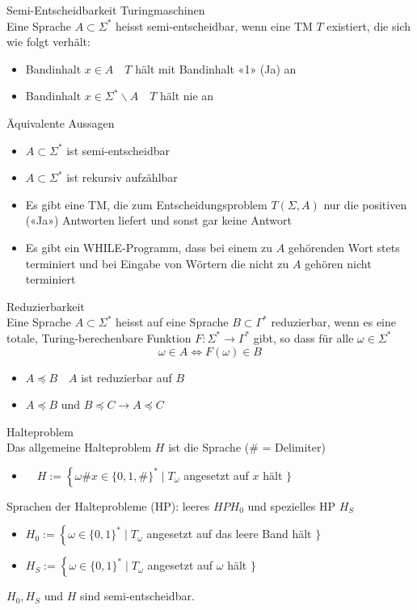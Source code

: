 \begin{corollary}{Semi-Entscheidbarkeit Turingmaschinen}\\
    Eine Sprache $A \subset \Sigma^{*}$ heisst semi-entscheidbar, wenn eine TM $T$ existiert, die sich wie folgt verhält:

    \begin{itemize}
    \item Bandinhalt $x \in A \quad T$ hält mit Bandinhalt «1» (Ja) an
    \item Bandinhalt $x \in \Sigma^{*} \backslash A \quad T$ hält nie an
    \end{itemize}

    Äquivalente Aussagen
    \begin{itemize}
    \item $A \subset \Sigma^{*}$ ist semi-entscheidbar
    \item $A \subset \Sigma^{*}$ ist rekursiv aufzählbar
    \item Es gibt eine TM, die zum Entscheidungsproblem $T(\Sigma, A)$ nur die positiven («Ja») Antworten liefert und sonst gar keine Antwort
    \item Es gibt ein WHILE-Programm, dass bei einem zu $A$ gehörenden Wort stets terminiert und bei Eingabe von Wörtern die nicht zu $A$ gehören nicht terminiert
    \end{itemize}
\end{corollary}

\begin{theorem}{Reduzierbarkeit}\\
    Eine Sprache $A \subset \Sigma^{*}$ heisst auf eine Sprache $B \subset \Gamma^{*}$ reduzierbar, wenn es eine totale, Turing-berechenbare Funktion $F: \Sigma^{*} \rightarrow \Gamma^{*}$ gibt, so dass für alle $\omega \in \Sigma^{*}$
    $$
    \omega \in A \Leftrightarrow F(\omega) \in B
    $$
    \begin{itemize}
    \item $A \preccurlyeq B \quad A$ ist reduzierbar auf $B$
    \item $A \preccurlyeq B$ und $B \preccurlyeq C \rightarrow A \preccurlyeq C$
    \end{itemize}
\end{theorem}

\begin{concept}{Halteproblem}\\
    Das allgemeine Halteproblem $H$ ist die Sprache (\# = Delimiter)
    \begin{itemize}
    \item $\quad H:=\left\{\omega \# x \in\{0,1, \#\}^{*} \mid T_{\omega}\right.$ angesetzt auf $x$ hält $\}$
    \end{itemize}
    Sprachen der Halteprobleme (HP): leeres $H P H_{0}$ und spezielles HP $H_{S}$
    \begin{itemize}
    \item $H_{0}:=\left\{\omega \in\{0,1\}^{*} \mid T_{\omega}\right.$ angesetzt auf das leere Band hält $\}$
    \item $H_{S}:=\left\{\omega \in\{0,1\}^{*} \mid T_{\omega}\right.$ angesetzt auf $\omega$ hält $\}$
    \end{itemize}
    $H_{0}, H_{S}$ und $H$ sind semi-entscheidbar.
\end{concept}
